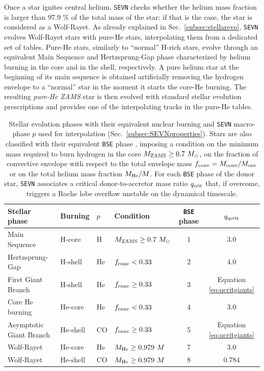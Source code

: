 \documentclass[a4paper,titlepage]{book}     	%
\newcommand{\sun}{\ensuremath{_\odot}}
\newcommand{\mzams}{M_\textup{ZAMS}}
\newcommand{\msun}{\ensuremath{M\sun}}
\begin{document}
Once a star ignites central helium, \texttt{SEVN} checks whether the helium mass fraction is larger than 97.9 \% of the total mass of the star: if that is the case, the star is considered as a Wolf-Rayet. As already explained in Sec.\ \ref{subsec:stellarevo}, \texttt{SEVN} evolves Wolf-Rayet stars with pure-He stars, interpolating them from a dedicated set of tables. Pure-He stars, similarly to ``normal'' H-rich stars, evolve through an equivalent Main Sequence and Hertzsprung-Gap phase characterized by helium burning in the core and in the shell, respectively. A pure helium star at the beginning of its main sequence is obtained artificially removing the hydrogen envelope to a ``normal'' star in the moment it starts the core-He burning. The resulting \emph{pure-He ZAMS} star is then evolved with standard stellar evolution prescriptions and provides one of the interpolating tracks in the pure-He tables.



\begin{table}
    \centering
    \begin{tabular}{llllcc}
        \toprule
        Stellar phase & Burning & $p$ & Condition & \texttt{BSE} phase &  $q_{\rm qcrit}$ \\ 
        \midrule
        Main Sequence           & H-core    &  H   & $\mzams \geq 0.7~\msun$          &  1  & 3.0        \\
        Hertzsprung-Gap         & H-shell   &  He  & $f_{\rm conv} < 0.33$       &  2  & 4.0        \\
        First Giant Branch      & H-shell   &  He  & $f_{\rm conv} \geq 0.33$    &  3  & Equation \ref{eq:qcritgiants} \\
        Core He burning         & He-core   &  He  & $f_{\rm conv} < 0.33$       &  4  & 3.0 \\ 
        Asymptotic Giant Branch & He-shell  &  CO  & $f_{\rm conv} \geq 0.33$    &  5  & Equation \ref{eq:qcritgiants} \\
        \hline
        Wolf-Rayet              & He-core   &  He  & $M_{\rm He} \geq 0.979~M$  &  7  & 3.0 \\ 
        Wolf-Rayet              & He-shell  &  CO  & $M_{\rm He} \geq 0.979~M$  &  8  & 0.784 \\ 
        \bottomrule
        \end{tabular}
    \caption{Stellar evolution phases with their equivalent nuclear burning and \texttt{SEVN} macro-phase $p$ used for interpolation (Sec.\ \ref{subsec:SEVNproperties}). Stars are also classified with their equivalent \texttt{BSE} phase \cite{Hurley2002}, imposing a condition on the minimum mass required to burn hydrogen in the core $\mzams \geq 0.7~\msun$, on the fraction of convective envelope with respect to the total envelope mass $f_{\rm conv}= M_{\rm conv}/M_{\rm env}$ or on the total helium mass fraction $M_{\rm He}/M$. For each \texttt{BSE} phase of the donor star, \texttt{SEVN} associates a critical donor-to-accretor mass ratio $q_{\rm crit}$ that, if overcome, triggers a Roche lobe overflow unstable on the dynamical timescale.}\label{tab:phasesqcritSEVN}
\end{table}
\end{document}
